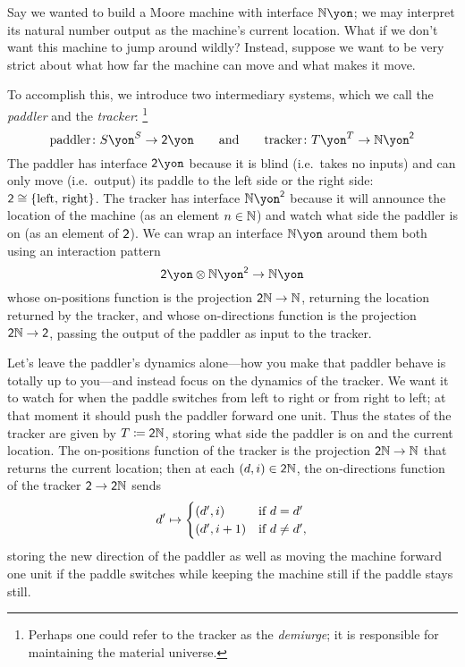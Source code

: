 \documentclass[Book-Poly]{subfiles}
\begin{document}
\begin{example}[Paddling]\label{ex.paddler}
Say we wanted to build a Moore machine with interface $\nn\yon$; we may interpret its natural number output as the machine's current location.
What if we don't want this machine to jump around wildly?
Instead, suppose we want to be very strict about what how far the machine can move and what makes it move.

To accomplish this, we introduce two intermediary systems, which we call the \emph{paddler} and the \emph{tracker}:%
\footnote{Perhaps one could refer to the tracker as the \emph{demiurge}; it is responsible for maintaining the material universe.}
\[
  \text{paddler}\colon S\yon^S\to\2\yon
  \qqand
  \text{tracker}\colon T\yon^T\to\nn\yon^\2
\]
The paddler has interface $\2\yon$ because it is blind (i.e.\ takes no inputs) and can only move (i.e.\ output) its paddle to the left side or the right side: $\textsf{2}\cong\{\text{left, right}\}$. The tracker has interface $\nn\yon^\2$ because it will announce the location of the machine (as an element $n\in\mathbb{N}$) and watch what side the paddler is on (as an element of $\textsf{2}$). 
We can wrap an interface $\nn\yon$ around them both using an interaction pattern
\[
    \2\yon\otimes\nn\yon^\2\to\nn\yon
\]
whose on-positions function is the projection $\textsf{2}\mathbb{N}\to\mathbb{N}$, returning the location returned by the tracker, and whose on-directions function is the projection $\textsf{2}\mathbb{N}\to\textsf{2}$, passing the output of the paddler as input to the tracker.

Let's leave the paddler's dynamics alone---how you make that paddler behave is totally up to you---and instead focus on the dynamics of the tracker.
We want it to watch for when the paddle switches from left to right or from right to left; at that moment it should push the paddler forward one unit. Thus the states of the tracker are given by $T\coloneqq\textsf{2}\mathbb{N}$, storing what side the paddler is on and the current location.
The on-positions function of the tracker is the projection $\textsf{2}\mathbb{N}\to\mathbb{N}$ that returns the current location; then at each $(d,i)\in\textsf{2}\mathbb{N}$, the on-directions function of the tracker $\textsf{2}\to\textsf{2}\mathbb{N}$ sends
\[
  d'\mapsto
	\begin{cases}
		(d',i)&\textnormal{if }d=d'\\
		(d',i+1)&\textnormal{if }d\neq d',
	\end{cases}
\]
storing the new direction of the paddler as well as moving the machine forward one unit if the paddle switches while keeping the machine still if the paddle stays still.
\end{example}
\end{document}
